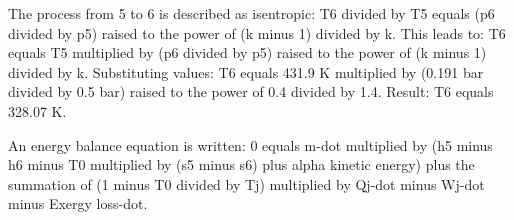 The process from 5 to 6 is described as isentropic:  
T6 divided by T5 equals (p6 divided by p5) raised to the power of (k minus 1) divided by k.  
This leads to:  
T6 equals T5 multiplied by (p6 divided by p5) raised to the power of (k minus 1) divided by k.  
Substituting values:  
T6 equals 431.9 K multiplied by (0.191 bar divided by 0.5 bar) raised to the power of 0.4 divided by 1.4.  
Result: T6 equals 328.07 K.  

An energy balance equation is written:  
0 equals m-dot multiplied by (h5 minus h6 minus T0 multiplied by (s5 minus s6) plus alpha kinetic energy) plus the summation of (1 minus T0 divided by Tj) multiplied by Qj-dot minus Wj-dot minus Exergy loss-dot.